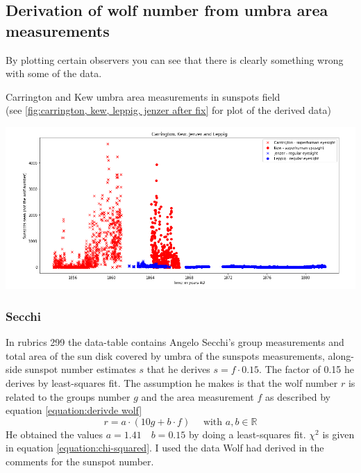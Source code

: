 \documentclass[12pt]{article}
\newcommand{\R}{\mathbb{R}}
\begin{document}
\subsection{Derivation of wolf number from umbra area measurements}\label{section:derivation from area}

By plotting certain observers you can see that there is clearly something wrong with some of the data.

{\centering
\caption{Carrington and Kew umbra area measurements in sunspots field \\(see \ref{fig:carrington, kew, leppig, jenzer after fix} for plot of the derived data)}
\includegraphics[width=\linewidth]{CarringtonHasGoodEyesight.png}\label{fig:carrington kew jenzer leppig sunspots plot}
\par}

\subsubsection{Secchi}
In rubrics 299 the data-table contains Angelo Secchi's group measurements and total area of the sun disk covered by umbra of the sunspots measurements, along-side sunspot number estimates $s$ that he derives $s = f \cdot 0.15$. The factor of 0.15 he derives by least-squares fit. The assumption he makes is that the wolf number $r$ is related to the groups number $g$ and the area measurement $f$ as described by equation \ref{equation:derivde wolf}
$$
r = a \cdot (10 g + b\cdot f)\quad \text{ with } a,b\in\R
$$
He obtained the values $a = 1.41\quad b=0.15$ by doing a least-squares fit. $\chi^2$ is given in equation \ref{equation:chi-squared}. I used the data Wolf had derived in the comments for the sunspot number.\\
\end{document}

